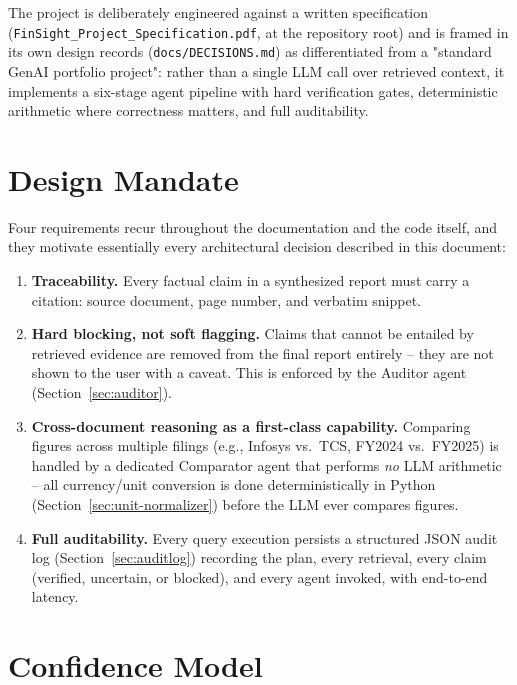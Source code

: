 \documentclass[11pt,a4paper]{report}
\newcommand{\file}[1]{\texttt{\small #1}}
\begin{document}
The project is deliberately engineered against a written specification
(\file{FinSight\_Project\_Specification.pdf}, at the repository root) and is framed in
its own design records (\file{docs/DECISIONS.md}) as differentiated from a "standard
GenAI portfolio project": rather than a single LLM call over retrieved context, it
implements a six-stage agent pipeline with hard verification gates, deterministic
arithmetic where correctness matters, and full auditability.

\section{Design Mandate}

Four requirements recur throughout the documentation and the code itself, and they
motivate essentially every architectural decision described in this document:

\begin{enumerate}[leftmargin=1.5em]
    \item \textbf{Traceability.} Every factual claim in a synthesized report must carry
    a citation: source document, page number, and verbatim snippet.
    \item \textbf{Hard blocking, not soft flagging.} Claims that cannot be entailed by
    retrieved evidence are removed from the final report entirely -- they are not shown
    to the user with a caveat. This is enforced by the Auditor agent
    (Section~\ref{sec:auditor}).
    \item \textbf{Cross-document reasoning as a first-class capability.} Comparing
    figures across multiple filings (e.g., Infosys vs.\ TCS, FY2024 vs.\ FY2025) is
    handled by a dedicated Comparator agent that performs \emph{no} LLM arithmetic --
    all currency/unit conversion is done deterministically in Python
    (Section~\ref{sec:unit-normalizer}) before the LLM ever compares figures.
    \item \textbf{Full auditability.} Every query execution persists a structured JSON
    audit log (Section~\ref{sec:auditlog}) recording the plan, every retrieval, every
    claim (verified, uncertain, or blocked), and every agent invoked, with end-to-end
    latency.
\end{enumerate}

\section{Confidence Model}
\end{document}
